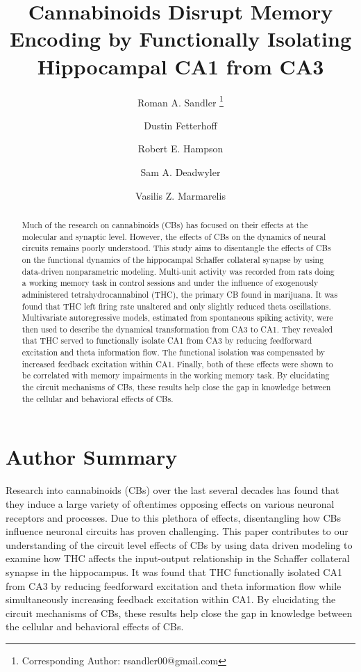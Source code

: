 \documentclass[11pt,a4paper,final]{article}
\title{\vspace{-30mm}\fontsize{14pt}{1pt}\textbf{Cannabinoids Disrupt Memory Encoding by Functionally Isolating Hippocampal CA1 from CA3}} %
\author[1]{Roman A. Sandler     \thanks{Corresponding Author: rsandler00@gmail.com}}
\author[2]{Dustin Fetterhoff    }   %
\author[2]{Robert E. Hampson    }	%
\author[2]{Sam A. Deadwyler     }	%
\author[1]{Vasilis Z. Marmarelis}
\affil[1]{Department of Biomedical Engineering, University of Southern California, Los Angeles, CA, USA}
\affil[2]{Department of Physiology \& Pharmacology, Wake Forest University, Winston-Salem, NC, USA}
\begin{document}
\maketitle %

\begin{abstract}
Much of the research on cannabinoids (CBs) has focused on their effects at the molecular and synaptic level.
However, the effects of CBs on the dynamics of neural circuits remains poorly understood.
This study aims to disentangle the effects of CBs on the functional dynamics of the hippocampal Schaffer collateral synapse by using data-driven nonparametric modeling.
Multi-unit activity was recorded from rats doing a working memory task in control sessions and under the influence of exogenously administered tetrahydrocannabinol (THC), the primary CB found in marijuana.
It was found that THC left firing rate unaltered and only slightly reduced theta oscillations.
Multivariate autoregressive models, estimated from spontaneous spiking activity, were then used to describe the dynamical transformation from CA3 to CA1.
They revealed that THC served to functionally isolate CA1 from CA3 by reducing feedforward excitation and theta information flow.
The functional isolation was compensated by increased feedback excitation within CA1.
Finally, both of these effects were shown to be correlated with memory impairments in the working memory task.
By elucidating the circuit mechanisms of CBs, these results help close the gap in knowledge between the cellular and behavioral effects of CBs.
\end{abstract}

\section*{Author Summary}
Research into cannabinoids (CBs) over the last several decades has found that they induce a large variety of oftentimes opposing effects on various neuronal receptors and processes.
Due to this plethora of effects, disentangling how CBs influence neuronal circuits has proven challenging.
This paper contributes to our understanding of the circuit level effects of CBs by using data driven modeling to examine how THC affects the input-output relationship in the Schaffer collateral synapse in the hippocampus.
It was found that THC functionally isolated CA1 from CA3 by reducing feedforward excitation and theta information flow while simultaneously increasing feedback excitation within CA1.
By elucidating the circuit mechanisms of CBs, these results help close the gap in knowledge between the cellular and behavioral effects of CBs.
\end{document}
